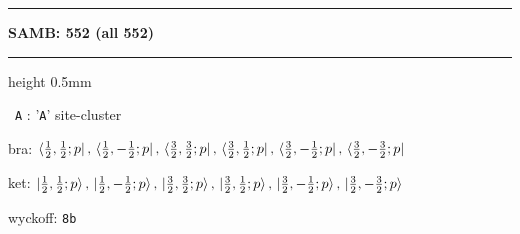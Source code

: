 \documentclass[fleqn,10pt,landscape]{jsarticle}
\begin{document}
\vspace{5mm}
\noindent \rule[0.5mm]{5mm}{0.5mm}\hspace{3mm}\textbf{SAMB: 552 (all 552)}\hspace{3mm}\leaders\hrule height 0.5mm\hfill\kern0pt
\vspace{3mm}

\vspace{5mm}

\noindent\textbullet\, \texttt{A} : '\texttt{A}' site-cluster

\noindent\quad * bra: $\bra{\frac{1}{2},\frac{1}{2};p},\, \bra{\frac{1}{2},- \frac{1}{2};p},\, \bra{\frac{3}{2},\frac{3}{2};p},\, \bra{\frac{3}{2},\frac{1}{2};p},\, \bra{\frac{3}{2},- \frac{1}{2};p},\, \bra{\frac{3}{2},- \frac{3}{2};p}$

\noindent\quad * ket: $\ket{\frac{1}{2},\frac{1}{2};p},\, \ket{\frac{1}{2},- \frac{1}{2};p},\, \ket{\frac{3}{2},\frac{3}{2};p},\, \ket{\frac{3}{2},\frac{1}{2};p},\, \ket{\frac{3}{2},- \frac{1}{2};p},\, \ket{\frac{3}{2},- \frac{3}{2};p}$

\noindent\quad * wyckoff: \texttt{8b}
\end{document}
